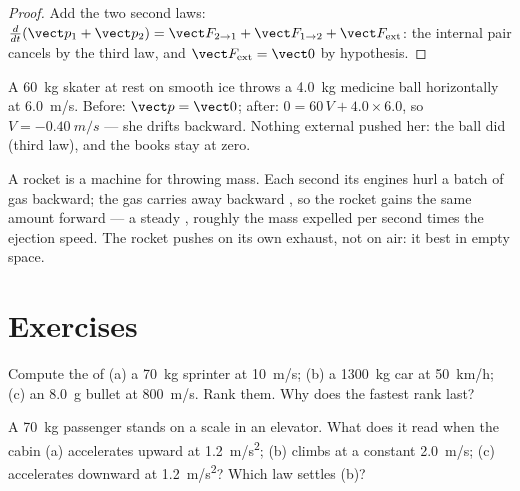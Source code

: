\begin{proof}
Add the two second laws: $\frac{d}{dt}(\vect p_1 + \vect p_2) = \vect F_{2 \to 1} +
\vect F_{1 \to 2} + \vect F_{\text{ext}}$: the internal pair cancels by the third
law, and $\vect F_{\text{ext}} = \vect 0$ by hypothesis.
\end{proof}

\begin{example}[Recoil]\label{ex:g12:newtons-laws:recoil}
A \qty{60}{kg} skater at rest on smooth ice throws a \qty{4.0}{kg} medicine ball
horizontally at \qty{6.0}{m/s}. Before: $\vect p = \vect 0$; after:
$0 = 60\,V + 4.0 \times 6.0$, so $V = \qty{-0.40}{m/s}$ --- she drifts backward.
Nothing external pushed her: the ball did (third law), and the books stay at zero.
\end{example}

\begin{remark}\label{rem:g12:newtons-laws:rocket}
A rocket is a machine for throwing mass. Each second its engines hurl a batch of gas
backward; the gas carries away backward , so the rocket gains the same
amount forward --- a steady , roughly the mass expelled per second times the
ejection speed. The rocket pushes on its own exhaust, not on air: it  best in
empty space.
\end{remark}

\section{Exercises}

\begin{exercise}[$\star$]\label{exo:g12:newtons-laws:1}
Compute the  of (a) a \qty{70}{kg} sprinter at \qty{10}{m/s}; (b) a
\qty{1300}{kg} car at \qty{50}{km/h}; (c) an \qty{8.0}{g} bullet at \qty{800}{m/s}.
Rank them. Why does the fastest rank last?
\end{exercise}

\begin{exercise}[$\star$]\label{exo:g12:newtons-laws:2}
A \qty{70}{kg} passenger stands on a scale in an elevator. What does it read when
the cabin (a) accelerates upward at \qty{1.2}{m/s^2}; (b) climbs at a constant
\qty{2.0}{m/s}; (c) accelerates downward at \qty{1.2}{m/s^2}? Which law settles (b)?
\end{exercise}

